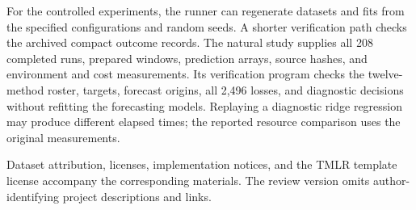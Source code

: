 For the controlled experiments, the runner can regenerate datasets and
fits from the specified configurations and random seeds. A shorter
verification path checks the archived compact outcome records. The
natural study supplies all 208 completed runs, prepared windows,
prediction arrays, source hashes, and environment and cost measurements.
Its verification program checks the twelve-method roster, targets,
forecast origins, all 2,496 losses, and diagnostic decisions without
refitting the forecasting models. Replaying a diagnostic ridge regression
may produce different elapsed times; the reported resource comparison
uses the original measurements.

Dataset attribution, licenses, implementation notices, and the TMLR
template license accompany the corresponding materials. The review
version omits author-identifying project descriptions and links.
